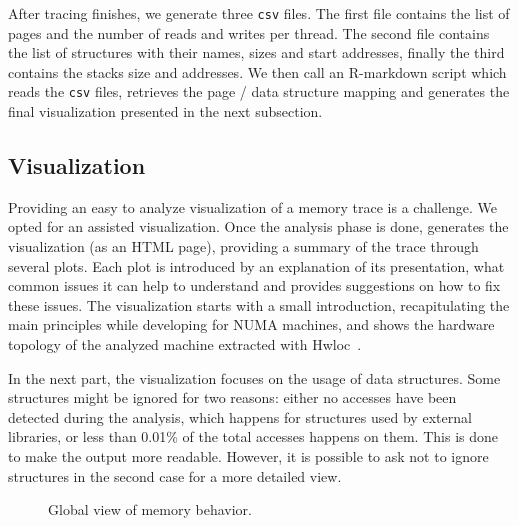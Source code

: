 After tracing finishes, we generate three \texttt{csv} files.  The first file
contains the list of pages and the number of reads and writes per thread. The
second file contains the list of structures with their names, sizes and start
addresses, finally the third contains the stacks size and addresses.
We then call an R-markdown script which reads the \texttt{csv} files,
retrieves the page / data structure mapping and generates the final
visualization presented in the next subsection.


\subsection{Visualization}
\label{sec:design-visu}

Providing an easy to analyze visualization of a memory trace is a challenge. We
opted for an assisted visualization. Once the analysis phase is done,
\TABARNAC generates the visualization (as an HTML page), providing a summary
of the trace through several plots. Each plot is introduced by an explanation
of its presentation, what common issues it can help to understand and provides
suggestions on how to fix these issues.  The visualization starts with a small
introduction, recapitulating the main principles while developing for NUMA
machines, and shows the hardware topology of the analyzed machine extracted
with Hwloc~\cite{Broquedis10hwloc}.

In the next part, the visualization focuses on the usage of data structures. Some
structures might be ignored for two reasons: either no accesses have been
detected during the analysis, which happens for structures used by external
libraries, or less than 0.01\% of the total accesses happens on them. This is
done to make the output more readable. However, it is possible to ask
\TABARNAC not to ignore structures in the second case for a more detailed view.

\begin{figure}[htb]
    \centering
    \label{fig:example_plot1}
    \caption{Global view of memory behavior.}
\end{figure}

